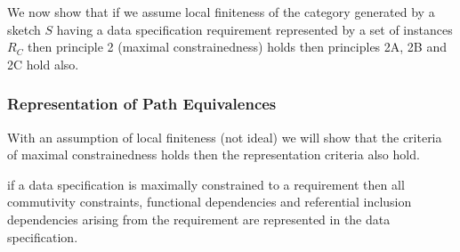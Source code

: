 We now show that if we assume local finiteness of the category \catcw generated by a sketch $S$ 
 having a data specification requirement represented by a set of
instances $R_C$ then  principle 2 (maximal constrainedness) holds then
principles 2A, 2B and 2C hold also. 

\subsubsection{Representation of Path Equivalences}
\note
With an assumption of local finiteness (not ideal) we will show that 
the criteria of maximal constrainedness holds then the representation criteria also hold.

if a data specification is maximally constrained to a
requirement then  all commutivity constraints,  functional dependencies and referential inclusion dependencies arising from the requirement are represented in the data specification.

